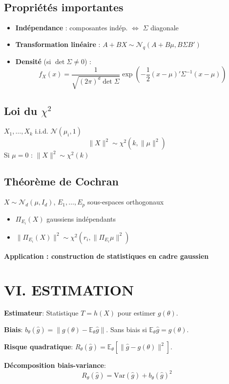 \documentclass[8pt,twocolumn]{article}
\newcommand{\mydef}[1]{\textcolor{defcolor}{\textbf{#1}}}
\newcommand{\mythm}[1]{\textcolor{thmcolor}{\textbf{#1}}}
\newcommand{\myprop}[1]{\textcolor{propcolor}{\textbf{#1}}}
\newcommand{\myrem}[1]{\textcolor{remcolor}{\textbf{#1}}}
\newcommand{\E}{\mathbb{E}}
\newcommand{\Var}{\text{Var}}
\begin{document}
\subsection{\myprop{Propriétés importantes}}
\begin{itemize}[nosep]
\item \textbf{Indépendance} : composantes indép. $\Leftrightarrow$ $\Sigma$ diagonale
\item \textbf{Transformation linéaire} : $A + BX \sim \mathcal{N}_q(A + B\mu, B\Sigma B')$
\item \textbf{Densité} (si $\det \Sigma \neq 0$) :
$$f_X(x) = \frac{1}{\sqrt{(2\pi)^d \det \Sigma}} \exp\left(-\frac{1}{2}(x-\mu)'\Sigma^{-1}(x-\mu)\right)$$
\end{itemize}

\subsection{Loi du $\chi^2$}
$X_1,\ldots,X_k$ i.i.d. $\mathcal{N}(\mu_i, 1)$
$$\|X\|^2 \sim \chi^2(k, \|\mu\|^2)$$
Si $\mu = 0$ : $\|X\|^2 \sim \chi^2(k)$

\subsection{\mythm{Théorème de Cochran}}
$X \sim \mathcal{N}_d(\mu, I_d)$, $E_1,\ldots,E_p$ sous-espaces orthogonaux
\begin{itemize}[nosep]
\item $\Pi_{E_i}(X)$ gaussiens indépendants
\item $\|\Pi_{E_i}(X)\|^2 \sim \chi^2(r_i, \|\Pi_{E_i}\mu\|^2)$
\end{itemize}

\myrem{Application : construction de statistiques en cadre gaussien}

\section*{\mydef{VI. ESTIMATION}}

\mydef{Estimateur}: Statistique $T=h(X)$ pour estimer $g(\theta)$.

\mydef{Biais}: $b_\theta(\hat{g}) = \|g(\theta) - \E_\theta\hat{g}\|$. Sans biais si $\E_\theta\hat{g}=g(\theta)$.

\mydef{Risque quadratique}: $R_\theta(\hat{g}) = \E_\theta[\|\hat{g}-g(\theta)\|^2]$.

\myprop{Décomposition biais-variance}: 
$$R_\theta(\hat{g}) = \Var(\hat{g}) + b_\theta(\hat{g})^2$$
\end{document}
